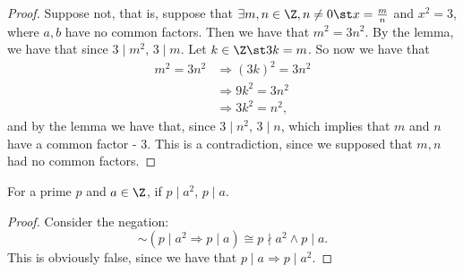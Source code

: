 \documentclass{assignment}
\begin{document}


\begin{proof}
Suppose not, that is, suppose that $\exists m,n\in\Z, n \neq 0 \st x = \frac{m}{n}$ and $x^2 = 3$,
where $a,b$ have no common factors. Then we have that $m^2 = 3n^2$. By the lemma, we have that since
$3\mid m^2$, $3\mid m$. Let $k\in\Z\st 3k = m$. So now we have that 
\begin{align*}
  m^2 = 3n^2 &\Rightarrow (3k)^2 = 3n^2 \\
             &\Rightarrow 9k^2 = 3n^2 \\
             &\Rightarrow 3k^2 = n^2,
\end{align*}
and by the lemma we have that, since $3\mid n^2$, $3\mid n$, which implies that $m$ and $n$ have a 
common factor - 3. This is a contradiction, since we supposed that $m,n$ had no common factors.
\end{proof}

\begin{lemma}
  For a prime $p$ and $a\in\Z$, if $p\mid a^2$, $p\mid a$.
\end{lemma}

\begin{proof}
  Consider the negation: $$\sim(p\mid a^2 \Rightarrow p\mid a) \cong p \nmid a^2 \wedge p\mid a.$$
  This is obviously false, since we have that $p\mid a \Rightarrow p\mid a^2$.
\end{proof}

\end{document}
